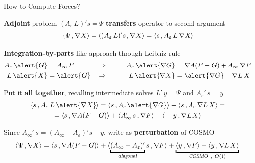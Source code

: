 \begin{frame}{How to Compute Forces?}
{\begin{wideitemize}

\item {\bf Adjoint} problem $(A_\varepsilon \, L)' s = \Psi$ {\bf transfers} operator to second argument
\[
\langle \Psi \, , \nabla X \rangle = \langle (A_\varepsilon \, L)' s \, , \nabla X \rangle = \langle  s \, , A_\varepsilon \, L \,\nabla X \rangle \displaybump
\]

\item {\bf Integration-by-parts} like approach through Leibniz rule
\begin{alignat*}{4}
A_\varepsilon \, \alert{G}& = A_\infty \, F  \qquad && \Rightarrow \qquad &  A_\varepsilon \, \alert{\nabla G} & = \nabla A ( F -G) + A_\infty \, \nabla F \displaybump \\
L \, \alert{X} & = \alert{G} &&\Rightarrow  &L \, \alert{\nabla X} & = \alert{\nabla G} - \nabla L \,  X
\end{alignat*}
\item Put it {\bf all together}, recalling intermediate solves $L' \, y= \Psi$ and $A_\varepsilon' \, s = y$
\begin{multline*}
\langle  s \, , A_\varepsilon \, L \,\alert{\nabla X} \rangle = \langle  s \, , A_\varepsilon \, \alert{\nabla G} \rangle -\langle  s \, ,A_\varepsilon \,  \nabla L \,  X  \rangle = \\
= \langle  s \, ,\nabla A ( F - G) \rangle + \langle A_\infty' \,  s \, ,  \nabla F \rangle -\langle \phantom{A_\varepsilon' } y \, , \nabla L \,  X  \rangle \displaybump
\end{multline*}
\item Since $A_\infty' \, s = (A_\infty - A_\varepsilon)' s + y$, write as {\bf perturbation} of COSMO
\[
\langle \Psi \, , \nabla X \rangle = \langle  s \, ,\nabla A ( F - G) \rangle + \langle \underbracket{(A_\infty - A_\varepsilon)'}_{\textsl{diagonal}} s \, ,  \nabla F \rangle + \underbracket{\langle y \, , \nabla F \rangle - \langle  y \, ,  \nabla L \,  X  \rangle}_{\textsl{COSMO} \:\: , \:\: O(1)} \displaybump
\]

\end{wideitemize}

}


\end{frame}


